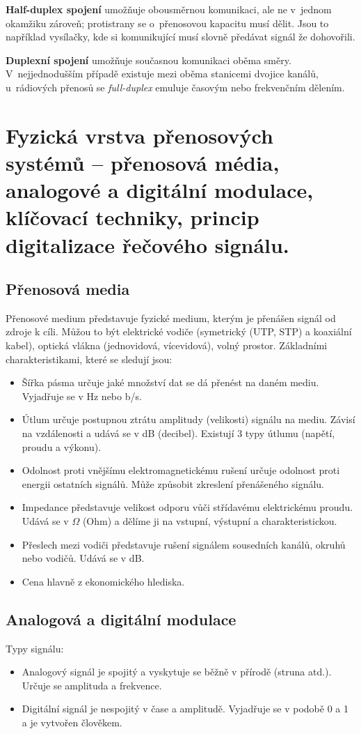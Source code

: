 \textbf{Half-duplex spojení} umožňuje obousměrnou komunikaci, ale ne v~jednom okamžiku zároveň; protistrany se o~přenosovou kapacitu musí dělit. Jsou to například vysílačky, kde si komunikující musí slovně předávat signál že dohovořili.

\textbf{Duplexní spojení} umožňuje současnou komunikaci oběma směry. V~nejjednodušším případě existuje mezi oběma stanicemi dvojice kanálů, u~rádiových přenosů se \emph{full-duplex} emuluje časovým nebo frekvenčním dělením.

\clearpage
\section{Fyzická vrstva přenosových systémů -- přenosová média, analogové a digitální modulace, klíčovací techniky, princip digitalizace řečového signálu.}

\subsection{Přenosová media}

Přenosové medium představuje fyzické medium, kterým je přenášen signál od zdroje k cíli. Můžou to být elektrické vodiče (symetrický (UTP, STP) a koaxiální kabel), optická vlákna (jednovidová, vícevidová), volný prostor.
Základními charakteristikami, které se sledují jsou:
\begin{itemize}[noitemsep]
    \item Šířka pásma určuje jaké množství dat se dá přenést na daném mediu. Vyjadřuje se v Hz nebo b/s. 
    \item Útlum určuje postupnou ztrátu amplitudy (velikosti) signálu na mediu. Závisí na vzdálenosti a udává se v dB (decibel). Existují 3 typy útlumu (napětí, proudu a výkonu).
    \item Odolnost proti vnějšímu elektromagnetickému rušení určuje odolnost proti energii ostatních signálů. Může způsobit zkreslení přenášeného signálu. 
    \item Impedance představuje velikost odporu vůči střídavému elektrickému proudu. Udává se v $\Omega$ (Ohm) a dělíme ji na vstupní, výstupní a charakteristickou. 
    \item Přeslech mezi vodiči představuje rušení signálem sousedních kanálů, okruhů nebo vodičů. Udává se v dB.
    \item Cena hlavně z ekonomického hlediska.
\end{itemize}


\subsection{Analogová a digitální modulace}
Typy signálu:
\begin{itemize}[noitemsep]
    \item Analogový signál je spojitý a vyskytuje se běžně v přírodě (struna atd.). Určuje se amplituda a frekvence.
    \item Digitální signál je nespojitý v čase a amplitudě. Vyjadřuje se v podobě 0 a 1 a je vytvořen člověkem.
\end{itemize}

